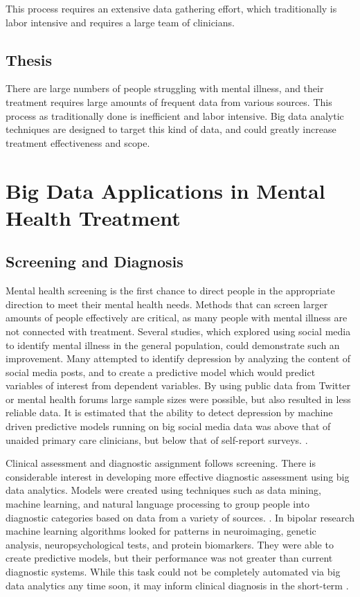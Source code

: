\documentclass[sigconf]{acmart}
\begin{document}
This process requires an extensive data gathering effort, which traditionally is labor intensive and requires a large team of clinicians.

\subsection{Thesis}

There are large numbers of people struggling with mental illness, and their treatment requires large amounts of frequent data from various sources. This process as traditionally done is inefficient and labor intensive. Big data analytic techniques are designed to target this kind of data, and could greatly increase treatment effectiveness and scope.

\section{Big Data Applications in Mental Health Treatment}

\subsection{Screening and Diagnosis}
Mental health screening is the first chance to direct people in the appropriate direction to meet their mental health needs. Methods that can screen larger amounts of people effectively are critical, as many people with mental illness are not connected with treatment. Several studies, which explored using social media to identify mental illness in the general population, could demonstrate such an improvement. Many attempted to identify depression by analyzing the content of social media posts, and to create a predictive model which would predict variables of interest from dependent variables. By using public data from Twitter or mental health forums large sample sizes were possible, but also resulted in less reliable data. It is estimated that the ability to detect depression by machine driven predictive models running on big social media data was above that of unaided primary care clinicians, but below that of self-report surveys. \cite{detectdepressionsocialmedia}.

Clinical assessment and diagnostic assignment follows screening. There is
considerable interest in developing more effective diagnostic assessment using big data analytics. Models were created using techniques such as data mining, machine learning, and natural language processing to group people into diagnostic categories based on data from a variety of sources. \cite{bigdatabipolar}. In bipolar research machine learning algorithms looked for patterns in neuroimaging, genetic analysis, neuropsychological tests, and protein biomarkers. They were able to create predictive models, but their performance was not greater than current diagnostic systems. While this task could not be completely automated via big data analytics any time soon, it may inform clinical diagnosis in the short-term \cite{machinelearnbipolar}. 
\end{document}
